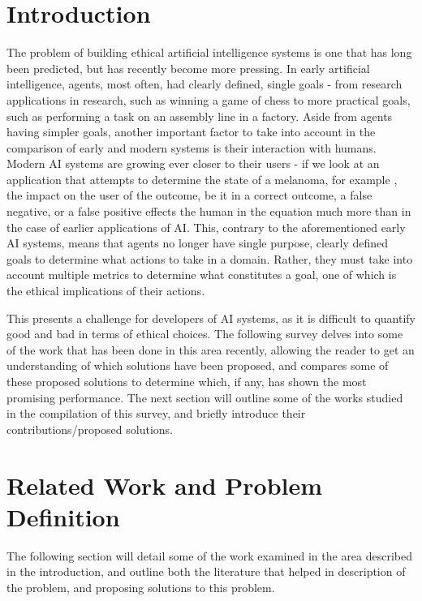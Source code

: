 \documentclass{svproc}
\begin{document}
\section{Introduction}
\par
The problem of building ethical artificial intelligence systems is one that has long been predicted, but has recently become more pressing. In early artificial intelligence, agents, most often, had clearly defined, single goals - from research applications in research, such as winning a game of chess to more practical goals, such as performing a task on an assembly line in a factory. Aside from agents having simpler goals, another important factor to take into account in the comparison of early and modern systems is their interaction with humans. Modern AI systems are growing ever closer to their users - if we look at an application that attempts to determine the state of a melanoma, for example \cite{kjoelen1995performance}, the impact on the user of the outcome, be it in a correct outcome, a false negative, or a false positive effects the human in the equation much more than in the case of earlier applications of AI. This, contrary to the aforementioned early AI systems, means that agents no longer have single purpose, clearly defined goals to determine what actions to take in a domain. Rather, they must take into account multiple metrics to determine what constitutes a goal, one of which is the ethical implications of their actions.
\par
This presents a challenge for developers of AI systems, as it is difficult to quantify good and bad in terms of ethical choices. The following survey delves into some of the work that has been done in this area recently, allowing the reader to get an understanding of which solutions have been proposed, and compares some of these proposed solutions to determine which, if any, has shown the most promising performance. The next section will outline some of the works studied in the compilation of this survey, and briefly introduce their contributions/proposed solutions.

\section{Related Work and Problem Definition}
\par
The following section will detail some of the work examined in the area described in the introduction, and outline both the literature that helped in description of the problem, and proposing solutions to this problem.
\end{document}

